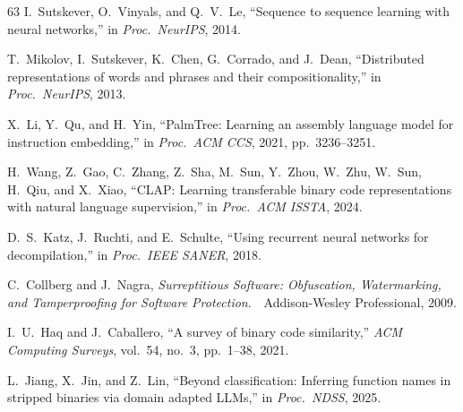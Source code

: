\documentclass[sigconf,nonacm]{acmart}
\begin{document}
{\begin{thebibliography}{63}
I.~Sutskever, O.~Vinyals, and Q.~V.~Le, ``Sequence to sequence learning with neural networks,'' in \emph{Proc.\ NeurIPS}, 2014.

T.~Mikolov, I.~Sutskever, K.~Chen, G.~Corrado, and J.~Dean, ``Distributed representations of words and phrases and their compositionality,'' in \emph{Proc.\ NeurIPS}, 2013.

X.~Li, Y.~Qu, and H.~Yin, ``PalmTree: Learning an assembly language model for instruction embedding,'' in \emph{Proc.\ ACM CCS}, 2021, pp.~3236--3251.

H.~Wang, Z.~Gao, C.~Zhang, Z.~Sha, M.~Sun, Y.~Zhou, W.~Zhu, W.~Sun, H.~Qiu, and X.~Xiao, ``CLAP: Learning transferable binary code representations with natural language supervision,'' in \emph{Proc.\ ACM ISSTA}, 2024.

D.~S.~Katz, J.~Ruchti, and E.~Schulte, ``Using recurrent neural networks for decompilation,'' in \emph{Proc.\ IEEE SANER}, 2018.

C.~Collberg and J.~Nagra, \emph{Surreptitious Software: Obfuscation, Watermarking, and Tamperproofing for Software Protection}.\ \ Addison-Wesley Professional, 2009.

I.~U.~Haq and J.~Caballero, ``A survey of binary code similarity,'' \emph{ACM Computing Surveys}, vol.~54, no.~3, pp.~1--38, 2021.

L.~Jiang, X.~Jin, and Z.~Lin, ``Beyond classification: Inferring function names in stripped binaries via domain adapted LLMs,'' in \emph{Proc.\ NDSS}, 2025.

\end{thebibliography}
}
\end{document}
